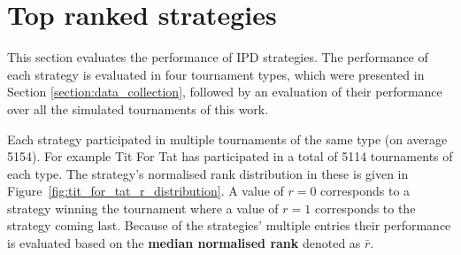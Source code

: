 \documentclass{article}
\newcommand{\numberofalltournaments}{}
\newcommand{\numberofstrategies}{}
\begin{document}
\begin{table}[!htbp]
    \begin{center}
\end{center}
\caption{Output result of a single tournament.}\label{table:output_result}
\end{table}

\section{Top ranked strategies}\label{section:top_performances}

This section evaluates the performance of \numberofstrategies IPD strategies. The performance of
each strategy is evaluated in four tournament types, which were presented in Section
\ref{section:data_collection}, followed by an evaluation of their performance
over all the \numberofalltournaments simulated tournaments of this work.

Each strategy participated in multiple tournaments of the same type (on average 5154).
For example Tit For Tat has participated in a total of 5114
tournaments of each type. The strategy's normalised rank distribution in these
is given in Figure~\ref{fig:tit_for_tat_r_distribution}. A value of \(r =
0\) corresponds to a strategy winning the tournament where a value of
\(r = 1\) corresponds to the strategy coming last. Because of the strategies'
multiple entries their performance is evaluated based on the
\textbf{median normalised rank} denoted as \(\bar{r}\).
\end{document}
